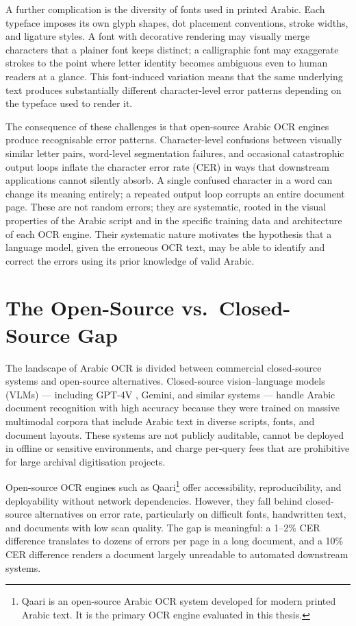 A further complication is the diversity of fonts used in printed Arabic.
Each typeface imposes its own glyph shapes, dot placement conventions,
stroke widths, and ligature styles. A font with decorative rendering may
visually merge characters that a plainer font keeps distinct; a calligraphic
font may exaggerate strokes to the point where letter identity becomes
ambiguous even to human readers at a glance. This font-induced variation
means that the same underlying text produces substantially different
character-level error patterns depending on the typeface used to render it.

The consequence of these challenges is that open-source Arabic OCR engines
produce recognisable error patterns. Character-level confusions between
visually similar letter pairs, word-level segmentation failures, and
occasional catastrophic output loops inflate the character error rate (CER)
in ways that downstream applications cannot silently absorb. A single
confused character in a word can change its meaning entirely; a repeated
output loop corrupts an entire document page. These are not random errors;
they are systematic, rooted in the visual properties of the Arabic script
and in the specific training data and architecture of each OCR engine. Their
systematic nature motivates the hypothesis that a language model, given the
erroneous OCR text, may be able to identify and correct the errors using its
prior knowledge of valid Arabic.

\section{The Open-Source vs.\ Closed-Source Gap}
\label{sec:intro_gap}

The landscape of Arabic OCR is divided between commercial closed-source
systems and open-source alternatives. Closed-source vision--language models
(VLMs) --- including GPT-4V \cite{brown2020language}, Gemini, and similar
systems --- handle Arabic document recognition with high accuracy because
they were trained on massive multimodal corpora that include Arabic text in
diverse scripts, fonts, and document layouts. These systems are not publicly
auditable, cannot be deployed in offline or sensitive environments, and charge
per-query fees that are prohibitive for large archival digitisation projects.

Open-source OCR engines such as Qaari\footnote{Qaari is an open-source
Arabic OCR system developed for modern printed Arabic text. It is the
primary OCR engine evaluated in this thesis.} offer accessibility,
reproducibility, and deployability without network dependencies. However,
they fall behind closed-source alternatives on error rate, particularly on
difficult fonts, handwritten text, and documents with low scan quality.
The gap is meaningful: a 1--2\% CER difference translates to dozens of
errors per page in a long document, and a 10\% CER difference renders a
document largely unreadable to automated downstream systems.


